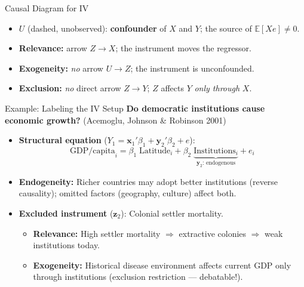 \documentclass[aspectratio=169, handout]{beamer}
\numberwithin{equation}{section}
\begin{document}
\begin{frame}{Causal Diagram for IV}
\begin{center}
\end{center}

\vspace{0.1cm}
\small
\begin{itemize}
\item $U$ (dashed, unobserved): \textbf{confounder} of $X$ and $Y$; the source of $\mathbb{E}[Xe]\neq 0$.
\item \textbf{Relevance:} arrow $Z\to X$; the instrument moves the regressor.
\item \textbf{Exogeneity:} \emph{no} arrow $U\to Z$; the instrument is unconfounded.
\item \textbf{Exclusion:} \emph{no} direct arrow $Z\to Y$; $Z$ affects $Y$ \emph{only through} $X$.
\end{itemize}
\end{frame}


\begin{frame}{Example: Labeling the IV Setup}
\textbf{Do democratic institutions cause economic growth?} (Acemoglu, Johnson \& Robinson 2001)
\vspace{0.2cm}
\begin{itemize}
\item \textbf{Structural equation} ($Y_1 = \bm{x}_1'\beta_1 + \bm{y}_2'\beta_2 + e$):
$$\text{GDP/capita}_i = \beta_1\;\text{Latitude}_i + \beta_2\;\underbrace{\text{Institutions}_i}_{\bm{y}_2\text{: endogenous}} + e_i$$
\item \textbf{Endogeneity:} Richer countries may adopt better institutions (reverse causality); omitted factors (geography, culture) affect both.
\item \textbf{Excluded instrument} ($\bm{z}_2$): Colonial settler mortality.
\begin{itemize}
\item \textbf{Relevance:} High settler mortality $\Rightarrow$ extractive colonies $\Rightarrow$ weak institutions today.
\item \textbf{Exogeneity:} Historical disease environment affects current GDP only through institutions (exclusion restriction --- debatable!).
\end{itemize}
\end{itemize}
\end{frame}
\end{document}
